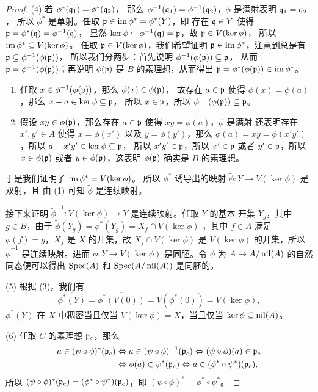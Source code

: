 \begin{proof}
  (4) 若 $\phi^*(\mathfrak{q}_1)=\phi^*(\mathfrak{q}_2)$，
  那么 $\phi^{-1}(\mathfrak{q}_1)=\phi^{-1}(\mathfrak{q}_2)$，$\phi$ 是满射表明 $\mathfrak{q}_1=\mathfrak{q}_2$，
  所以 $\phi^*$ 是单射。任取 $\mathfrak{p}\in \operatorname{im}\phi^*=\phi^*(Y)$，即
  存在 $\mathfrak{q}\in Y$ 使得 $\mathfrak{p}=\phi^*(\mathfrak{q})=\phi^{-1}(\mathfrak{q})$，
  显然 $\ker\phi\subseteq\phi^{-1}(\mathfrak{q})=\mathfrak{p}$，故 $\mathfrak{p}\in V(\ker\phi)$，
  所以 $\operatorname{im}\phi^*\subseteq V(\ker\phi)$。
  任取 $\mathfrak{p}\in V(\ker\phi)$，我们希望证明 $\mathfrak{p}\in\operatorname{im}\phi^*$，注意到总是有
  $\mathfrak{p}\subseteq \phi^{-1}(\phi(\mathfrak{p}))$，
  所以我们分两步：首先说明 $\phi^{-1}(\phi(\mathfrak{p}))\subseteq \mathfrak{p}$，
  从而 $\mathfrak{p}=\phi^{-1}(\phi(\mathfrak{p}))$；再说明 $\phi(\mathfrak{p})$
  是 $B$ 的素理想，从而得出 $\mathfrak{p}=\phi^*(\phi(\mathfrak{p}))\in\operatorname{im}\phi^*$。
  \begin{enumerate}
    \item 任取
    $x\in\phi^{-1}(\phi(\mathfrak{p}))$，那么 $\phi(x)\in\phi(\mathfrak{p})$，
    故存在 $a\in\mathfrak{p}$ 使得 $\phi(x)=\phi(a)$，那么 $x-a\in\ker\phi\subseteq\mathfrak{p}$，
    所以 $x\in\mathfrak{p}$，所以 $\phi^{-1}(\phi(\mathfrak{p}))\subseteq\mathfrak{p}$。
    \item 假设
    $xy\in\phi(\mathfrak{p})$，那么存在 $a\in \mathfrak{p}$ 使得 $xy=\phi(a)$，$\phi$ 是满射
    还表明存在 $x',y'\in A$ 使得 $x=\phi(x')$ 以及 $y=\phi(y')$，那么
    $\phi(a)=xy=\phi(x'y')$，所以 $a-x'y'\in\ker\phi\subseteq\mathfrak{p}$，
    所以 $x'y'\in\mathfrak{p}$，所以 $x'\in\mathfrak{p}$ 或者 $y'\in\mathfrak{p}$，所以
    $x\in\phi(\mathfrak{p})$ 或者 $y\in\phi(\mathfrak{p})$，这表明 $\phi(\mathfrak{p})$ 
    确实是 $B$ 的素理想。
  \end{enumerate}
  于是我们证明了 $\operatorname{im}\phi^*=V(\ker\phi)$。
  所以 $\phi^*$ 诱导出的映射 $\tilde{\phi}:Y\to V(\ker\phi)$ 是双射，且
  由 (1) 可知 $\tilde{\phi}$ 是连续映射。

  接下来证明 $\tilde{\phi}^{-1}:V(\ker\phi)\to Y$ 是连续映射。任取 $Y$ 的基本
  开集 $Y_g$，其中 $g\in B$，由于 $\tilde{\phi}(Y_g)=\phi^*(Y_g)=X_f\cap V(\ker\phi)$
  ，其中 $f\in A$ 满足 $\phi(f)=g$，$X_f$ 是 $X$ 的开集，故
  $X_f\cap V(\ker\phi)$ 是 $V(\ker\phi)$ 的开集，所以 $\tilde{\phi}^{-1}$
  是连续映射。进而 $\tilde{\phi}:Y\to V(\ker\phi)$ 是同胚。令 
  $\phi$ 为 $A\to A/\operatorname{nil}(A)$ 的自然同态便可以得出 $\operatorname{Spec}(A)$ 和 $\operatorname{Spec}(A/\operatorname{nil}(A))$ 是同胚的。

  (5) 根据 (3)，我们有
  \[
    \overline{\phi^*(Y)}=\overline{\phi^*(V(0))}
    =V(\phi^*(0))=V(\ker\phi),
  \]
  $\phi^*(Y)$ 在 $X$ 中稠密当且仅当 $V(\ker\phi)=X$，当且仅当
  $\ker\phi\subseteq\operatorname{nil}(A)$。

  (6) 任取 $C$ 的素理想 $\mathfrak{p}_c$，那么
  \begin{align*}
    a\in (\psi\circ\phi)^*(\mathfrak{p}_c)&\Leftrightarrow 
    a\in (\psi\circ \phi)^{-1}(\mathfrak{p}_c)  
    \Leftrightarrow (\psi\circ\phi)(a)\in\mathfrak{p}_c \\
    &\Leftrightarrow
    \phi(a)\in\psi^*(\mathfrak{p}_c)
    \Leftrightarrow a\in(\phi^*\circ \psi^*)(\mathfrak{p}_c),
  \end{align*}
  所以 $ (\psi\circ\phi)^*(\mathfrak{p}_c)=(\phi^*\circ \psi^*)(\mathfrak{p}_c)$，即
  $(\psi\circ\phi)^*=\phi^*\circ \psi^*$。


\end{proof}
